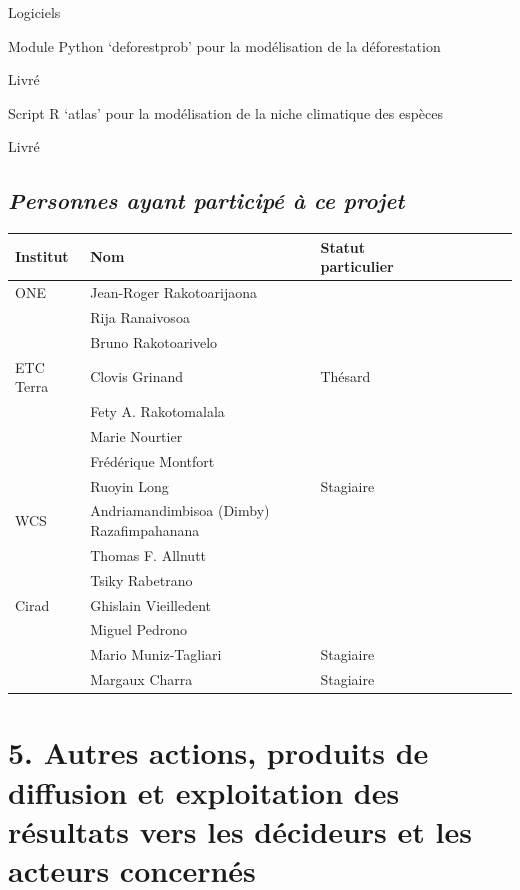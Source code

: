 \documentclass[12pt,]{article}
\begin{document}
Logiciels

Module Python `deforestprob' pour la modélisation de la déforestation

Livré

Script R `atlas' pour la modélisation de la niche climatique des espèces

Livré

\newpage

\hypertarget{personnes-ayant-participe-a-ce-projet}{%
\subsection{\texorpdfstring{\emph{Personnes ayant participé à ce
projet}}{Personnes ayant participé à ce projet}}\label{personnes-ayant-participe-a-ce-projet}}

\begin{tabular}{lllllllll}
\toprule
Institut & Nom & Statut particulier\\
\midrule
ONE & Jean-Roger Rakotoarijaona & \\
 & Rija Ranaivosoa & \\
 & Bruno Rakotoarivelo & \\
ETC Terra & Clovis Grinand & Thésard\\
 & Fety A. Rakotomalala & \\
\addlinespace
 & Marie Nourtier & \\
 & Frédérique Montfort & \\
 & Ruoyin Long & Stagiaire\\
WCS & Andriamandimbisoa (Dimby) Razafimpahanana & \\
 & Thomas F. Allnutt & \\
\addlinespace
 & Tsiky Rabetrano & \\
Cirad & Ghislain Vieilledent & \\
 & Miguel Pedrono & \\
 & Mario Muniz-Tagliari & Stagiaire\\
 & Margaux Charra & Stagiaire\\
\bottomrule
\end{tabular}

\hypertarget{autres-actions-produits-de-diffusion-et-exploitation-des-resultats-vers-les-decideurs-et-les-acteurs-concernes}{%
\section{5. Autres actions, produits de diffusion et exploitation des
résultats vers les décideurs et les acteurs
concernés}\label{autres-actions-produits-de-diffusion-et-exploitation-des-resultats-vers-les-decideurs-et-les-acteurs-concernes}}
\end{document}
